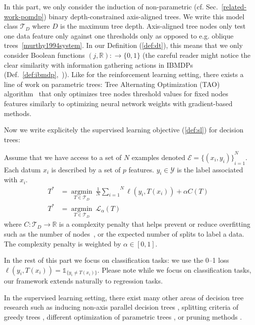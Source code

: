 In this part, we only consider the induction of non-parametric (cf. Sec.~\ref{related-work-pomdp}) binary depth-constrained axis-aligned trees. 
We write this model class $\mathcal{T}_D$ where $D$ is the maximum tree depth.
Axis-aligned tree nodes only test one data feature only against one thresholds only as opposed to e.g. oblique trees~\ref{murthy1994system}.
In our Definition (\ref{def:dt}), this means that we only consider Boolean functions $(j, \mathbb{R}):\rightarrow \{0, 1\}$ (the careful reader might notice the clear similarity with information gathering actions in IBMDPs (Def.~\ref{def:ibmdp},~\cite{topin2021iterative})).
Like for the reinforcement learning setting, there exists a line of work on parametric trees: Tree Alternating Optimization (TAO) algorithm~\cite{NEURIPS2018_185c29dc,9534446,10.1145/3412815.3416882} that only optimizes tree nodes threshold values for fixed nodes features similarly to optimizing neural network weights with gradient-based methods. 

Now we write explicitely the supervised learning objective (\ref{def:sl}) for decision trees:

\begin{definition}\label{eq:suplearning}
    Assume that we have access to a set of $N$ examples denoted $\mathcal{E} = {\{(x_i, y_i)\}}_{i=1}^N$. Each datum $x_i$ is described by a set of $p$ features. $y_i \in {\mathcal Y}$ is the label associated with $x_i$.
    \begin{align*}
    T^* &= \underset{T \in \mathcal{T}_D}{\operatorname{argmin}}\ \frac{1}{N}\overset{N}{\underset{i=1}{\sum}}{\ell}(y_i, T(x_i)) + \alpha C(T) \\
    T^* &= \underset{T \in \mathcal{T}_D}{\operatorname{argmin}}\ {\mathcal L}_\alpha(T)
\end{align*}
where $C: \mathcal{T}_D \rightarrow \mathbb{R}$ is a complexity penalty that helps prevent or reduce overfitting such as the number of nodes~\cite{breiman1984classification,quantbnb}, or the expected number of splits to label a data\cite{how-eff}. The complexity penalty is weighted by $\alpha \in [0, 1]$. %
\end{definition}

In the rest of this part we focus on classification tasks: we use the 0--1 loss $\ell(y_i, T(x_i)) = \mathds{1}_{\{y_i\neq T(x_i)\}}$.
Please note while we focus on classification tasks, our framework extends naturally to regression tasks.

In the supervised learning setting, there exist many other areas of decision tree research \cite{loh2014fifty} such as inducing non-axis parallel decision trees \cite{murthy1994system,10.1145/3637528.3671903}, splitting criteria of greedy trees \cite{vanderlinden2024optimalgreedydecisiontrees}, different optimization of parametric trees \cite{NIPS2015_1579779b,10.5555/3327757.3327770}, or pruning methods \cite{pruning1,pruning2}. 